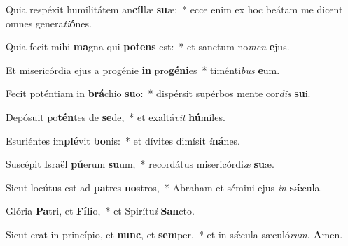 ﻿\item Quia respéxit humilitátem an\textbf{cíl}læ \textbf{su}æ:~* ecce enim ex hoc beátam me dicent omnes genera\textit{ti}\textbf{ó}nes.

\item Quia fecit mihi \textbf{ma}gna qui \textbf{po}\textbf{tens} est:~* et sanctum no\textit{men} \textbf{e}jus.

\item Et misericórdia ejus a progénie \textbf{in} pro\textbf{gé}\textbf{ni}es~* timénti\textit{bus} \textbf{e}um.

\item Fecit poténtiam in \textbf{brá}chio \textbf{su}o:~* dispérsit supérbos mente cor\textit{dis} \textbf{su}i.

\item Depósuit po\textbf{tén}tes de \textbf{se}de,~* et exaltá\textit{vit} \textbf{hú}miles.

\item Esuriéntes im\textbf{plé}vit \textbf{bo}nis:~* et dívites dimísit \textit{i}\textbf{ná}nes.

\item Suscépit Israël \textbf{pú}erum \textbf{su}um,~* recordátus misericórdi\textit{æ} \textbf{su}æ.

\item Sicut locútus est ad \textbf{pa}tres \textbf{no}stros,~* Abraham et sémini ejus \textit{in} \textbf{sǽ}cula.

\item Glória \textbf{Pa}tri, et \textbf{Fí}\textbf{li}o,~* et Spirítu\textit{i} \textbf{San}cto.

\item Sicut erat in princípio, et \textbf{nunc}, et \textbf{sem}per,~* et in sǽcula sæculó\textit{rum}. \textbf{A}men.